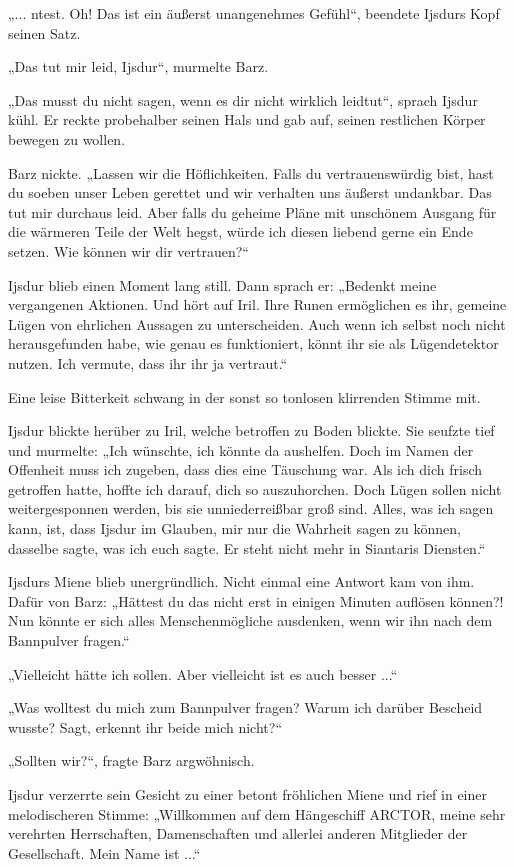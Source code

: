„... ntest. Oh! Das ist ein äußerst unangenehmes Gefühl“, beendete Ijsdurs Kopf seinen Satz.

„Das tut mir leid, Ijsdur“, murmelte Barz.

„Das musst du nicht sagen, wenn es dir nicht wirklich leidtut“, sprach Ijsdur kühl. Er reckte probehalber seinen Hals und gab auf, seinen restlichen Körper bewegen zu wollen.

Barz nickte. „Lassen wir die Höflichkeiten. Falls du vertrauenswürdig bist, hast du soeben unser Leben gerettet und wir verhalten uns äußerst undankbar. Das tut mir durchaus leid. Aber falls du geheime Pläne mit unschönem Ausgang für die wärmeren Teile der Welt hegst, würde ich diesen liebend gerne ein Ende setzen. Wie können wir dir vertrauen?“

Ijsdur blieb einen Moment lang still. Dann sprach er: „Bedenkt meine vergangenen Aktionen. Und hört auf Iril. Ihre Runen ermöglichen es ihr, gemeine Lügen von ehrlichen Aussagen zu unterscheiden. Auch wenn ich selbst noch nicht herausgefunden habe, wie genau es funktioniert, könnt ihr sie als Lügendetektor nutzen. Ich vermute, dass ihr ihr ja vertraut.“

Eine leise Bitterkeit schwang in der sonst so tonlosen klirrenden Stimme mit.

Ijsdur blickte herüber zu Iril, welche betroffen zu Boden blickte. Sie seufzte tief und murmelte: „Ich wünschte, ich könnte da aushelfen. Doch im Namen der Offenheit muss ich zugeben, dass dies eine Täuschung war. Als ich dich frisch getroffen hatte, hoffte ich darauf, dich so auszuhorchen. Doch Lügen sollen nicht weitergesponnen werden, bis sie unniederreißbar groß sind. Alles, was ich sagen kann, ist, dass Ijsdur im Glauben, mir nur die Wahrheit sagen zu können, dasselbe sagte, was ich euch sagte. Er steht nicht mehr in Siantaris Diensten.“

Ijsdurs Miene blieb unergründlich. Nicht einmal eine Antwort kam von ihm. Dafür von Barz: „Hättest du das nicht erst in einigen Minuten auflösen können?! Nun könnte er sich alles Menschenmögliche ausdenken, wenn wir ihn nach dem Bannpulver fragen.“

„Vielleicht hätte ich sollen. Aber vielleicht ist es auch besser ...“

„Was wolltest du mich zum Bannpulver fragen? Warum ich darüber Bescheid wusste? Sagt, erkennt ihr beide mich nicht?“

„Sollten wir?“, fragte Barz argwöhnisch.

Ijsdur verzerrte sein Gesicht zu einer betont fröhlichen Miene und rief in einer melodischeren Stimme: „Willkommen auf dem Hängeschiff ARCTOR, meine sehr verehrten Herrschaften, Damenschaften und allerlei anderen Mitglieder der Gesellschaft. Mein Name ist ...“

